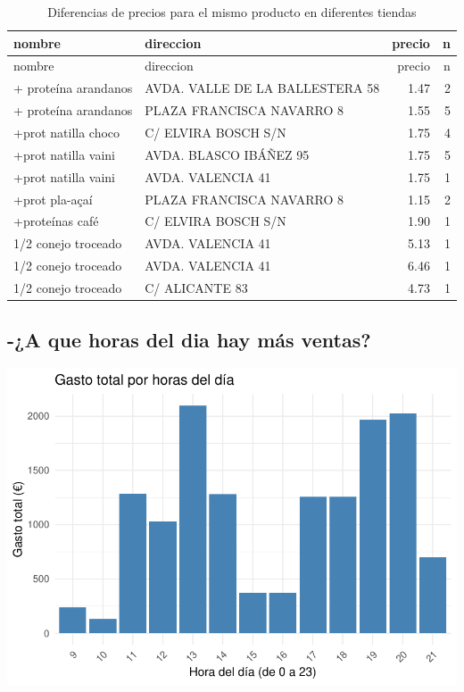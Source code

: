\documentclass[,article,submit,moreauthors,pdftex]{Definitions/mdpi}
\begin{document}
\begin{longtable}[]{@{}llrr@{}}
\caption{Diferencias de precios para el mismo producto en diferentes
tiendas}\tabularnewline
\toprule\noalign{}
nombre & direccion & precio & n \\
\midrule\noalign{}
\endfirsthead
\toprule\noalign{}
nombre & direccion & precio & n \\
\midrule\noalign{}
\endhead
\bottomrule\noalign{}
\endlastfoot
+ proteína arandanos & AVDA. VALLE DE LA BALLESTERA 58 & 1.47 & 2 \\
+ proteína arandanos & PLAZA FRANCISCA NAVARRO 8 & 1.55 & 5 \\
+prot natilla choco & C/ ELVIRA BOSCH S/N & 1.75 & 4 \\
+prot natilla vaini & AVDA. BLASCO IBÁÑEZ 95 & 1.75 & 5 \\
+prot natilla vaini & AVDA. VALENCIA 41 & 1.75 & 1 \\
+prot pla-açaí & PLAZA FRANCISCA NAVARRO 8 & 1.15 & 2 \\
+proteínas café & C/ ELVIRA BOSCH S/N & 1.90 & 1 \\
1/2 conejo troceado & AVDA. VALENCIA 41 & 5.13 & 1 \\
1/2 conejo troceado & AVDA. VALENCIA 41 & 6.46 & 1 \\
1/2 conejo troceado & C/ ALICANTE 83 & 4.73 & 1 \\
\end{longtable}

\hypertarget{a-que-horas-del-dia-hay-muxe1s-ventas}{%
\subsection{-¿A que horas del dia hay más
ventas?}\label{a-que-horas-del-dia-hay-muxe1s-ventas}}

\includegraphics[width=0.9\linewidth]{ProyectoTD2025_files/figure-latex/unnamed-chunk-28-1}
\end{document}
